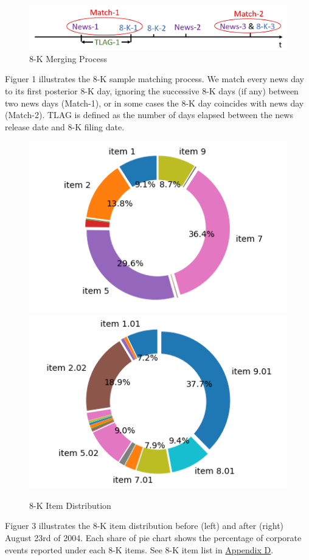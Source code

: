 \begin{figure}
	\caption{8-K Merging Process} \label{fig1}
	\begin{center}
		\includegraphics[scale=0.6]{../output/fig/fig1_matching.png}
	\end{center}
\end{figure}

Figuer 1 illustrates the 8-K sample matching process. We match every news day to its first posterior 8-K day, ignoring the successive 8-K days (if any) between two news days (Match-1), or in some cases the 8-K day coincides with news day (Match-2). TLAG is defined as the number of days elapsed between the news release date and 8-K filing date.

 \label{fig2}

\setcounter{figure}{2}
\begin{figure}[htbp]
	\begin{center}
		\caption{8-K Item Distribution} \label{fig3}
		\includegraphics[scale=0.5]{../output/fig/fig3_8-K_before.png}
		\includegraphics[scale=0.5]{../output/fig/fig3_8-K_after.png}
	\end{center}
\end{figure}

Figuer 3 illustrates the 8-K item distribution before (left) and after (right) August 23rd of 2004. Each share of pie chart shows the percentage of corporate events reported under each 8-K items. See 8-K item list in \hyperref[appd]{Appendix D}.